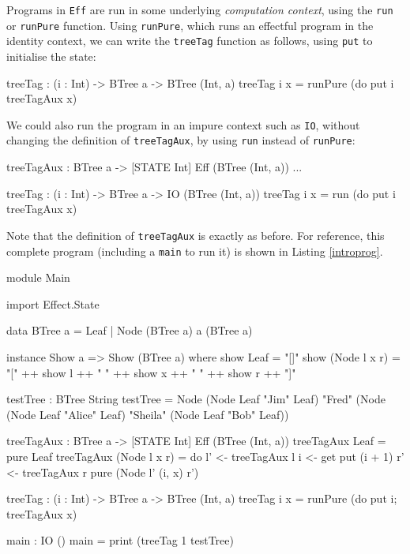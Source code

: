 Programs in \texttt{Eff} are run in some underlying \emph{computation context},
using the \texttt{run} or \texttt{runPure} function. Using
\texttt{runPure}, which runs an effectful program in the identity context,
we can write the \texttt{treeTag} function as follows, using \texttt{put}
to initialise the state:

\begin{code}
treeTag : (i : Int) -> BTree a -> BTree (Int, a)
treeTag i x = runPure (do put i
                          treeTagAux x)
\end{code}

\noindent
We could also run the program in an impure context such as \texttt{IO},
without changing the definition of \texttt{treeTagAux},
by using \texttt{run} instead of \texttt{runPure}:

\begin{code}
treeTagAux : BTree a -> { [STATE Int] } Eff (BTree (Int, a))
...

treeTag : (i : Int) -> BTree a -> IO (BTree (Int, a))
treeTag i x = run (do put i
                      treeTagAux x)
\end{code}

\noindent
Note that the definition of \texttt{treeTagAux} is exactly as before.
For reference, this
complete program (including a \texttt{main} to run it) is shown in
Listing \ref{introprog}.

\begin{code}[float=h,frame=single, caption={Tree tagging}, label=introprog]
module Main

import Effect.State

data BTree a = Leaf
             | Node (BTree a) a (BTree a)

instance Show a => Show (BTree a) where
    show Leaf = "[]"
    show (Node l x r) = "[" ++ show l ++ " "
                            ++ show x ++ " "
                            ++ show r ++ "]"

testTree : BTree String
testTree = Node (Node Leaf "Jim" Leaf)
              "Fred"
              (Node (Node Leaf "Alice" Leaf)
                    "Sheila"
                    (Node Leaf "Bob" Leaf))

treeTagAux : BTree a -> { [STATE Int] } Eff (BTree (Int, a))
treeTagAux Leaf = pure Leaf
treeTagAux (Node l x r) = do l' <- treeTagAux l
                             i <- get
                             put (i + 1)
                             r' <- treeTagAux r
                             pure (Node l' (i, x) r')

treeTag : (i : Int) -> BTree a -> BTree (Int, a)
treeTag i x = runPure (do put i; treeTagAux x)

main : IO ()
main = print (treeTag 1 testTree)
\end{code}


